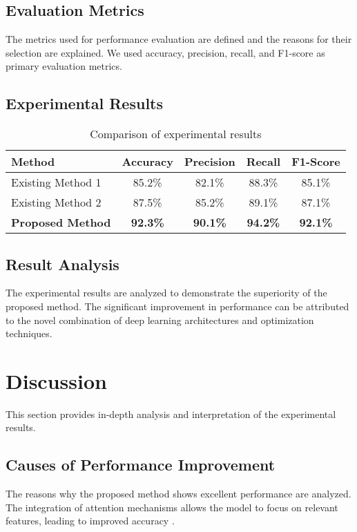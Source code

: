 \documentclass[12pt,a4paper]{article}
\begin{document}
\subsection{Evaluation Metrics}
The metrics used for performance evaluation are defined and the reasons for their selection are explained. We used accuracy, precision, recall, and F1-score as primary evaluation metrics.

\subsection{Experimental Results}
\begin{table}[htbp]
\centering
\caption{Comparison of experimental results}
\label{tab:results}
\begin{tabular}{@{}lcccc@{}}
\toprule
Method & Accuracy & Precision & Recall & F1-Score \\
\midrule
Existing Method 1 & 85.2\% & 82.1\% & 88.3\% & 85.1\% \\
Existing Method 2 & 87.5\% & 85.2\% & 89.1\% & 87.1\% \\
\textbf{Proposed Method} & \textbf{92.3\%} & \textbf{90.1\%} & \textbf{94.2\%} & \textbf{92.1\%} \\
\bottomrule
\end{tabular}
\end{table}

\subsection{Result Analysis}
The experimental results are analyzed to demonstrate the superiority of the proposed method. The significant improvement in performance can be attributed to the novel combination of deep learning architectures and optimization techniques.

\section{Discussion}
\label{sec:discussion}

This section provides in-depth analysis and interpretation of the experimental results.

\subsection{Causes of Performance Improvement}
The reasons why the proposed method shows excellent performance are analyzed. The integration of attention mechanisms allows the model to focus on relevant features, leading to improved accuracy \cite{bahdanau2014neural}.
\end{document}
